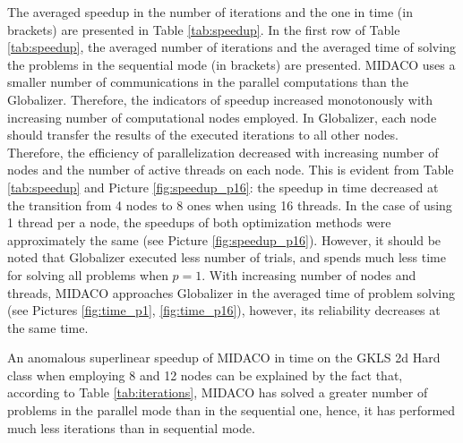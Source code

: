 \documentclass{svproc}
\begin{document}
The averaged speedup in the number of iterations and the one in time (in brackets) are presented in
Table \ref{tab:speedup}. In the first row of Table \ref{tab:speedup}, the averaged number of
iterations and the averaged time of solving the problems in the sequential mode (in brackets) are
presented. MIDACO uses a smaller number of communications in the parallel computations than the Globalizer.
Therefore, the indicators of speedup increased monotonously with increasing number of
computational nodes employed. In Globalizer, each node should transfer the results of the executed
iterations to all other nodes. Therefore, the efficiency of parallelization decreased with increasing
number of nodes and the number of active threads on each node. This is evident from Table
\ref{tab:speedup} and Picture \ref{fig:speedup_p16}: the speedup in time decreased at the transition from 4 nodes to 8 ones when
using 16 threads. In the case of using 1 thread per a node, the speedups of both optimization methods
were approximately the same (see Picture \ref{fig:speedup_p16}). However, it should be noted that Globalizer executed less number of
trials, and spends much less time for solving all problems when \(p=1\). With increasing number of
nodes and threads, MIDACO approaches Globalizer in the averaged time of problem solving (see Pictures \ref{fig:time_p1}, \ref{fig:time_p16}),
however, its reliability decreases at the same time.

An anomalous superlinear speedup of MIDACO in time on the GKLS 2d Hard class when
employing 8 and 12 nodes can be explained by the fact that, according to Table \ref{tab:iterations},
MIDACO has solved a greater number of problems in the parallel mode than in the sequential one,
hence, it has performed much less iterations than in sequential mode.
\end{document}
